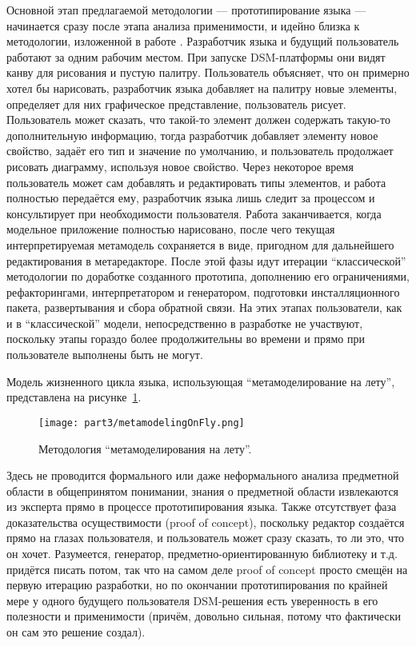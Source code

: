 Основной этап предлагаемой методологии --- прототипирование языка --- начинается сразу 
после этапа анализа применимости, и идейно близка к методологии, изложенной в работе 
\cite{repenning1995agentsheets}. Разработчик языка и будущий пользователь работают 
за одним рабочим местом. При запуске DSM-платформы они видят канву для рисования и 
пустую палитру. Пользователь объясняет, что он примерно хотел бы нарисовать, разработчик 
языка добавляет на палитру новые элементы, определяет для них графическое представление, 
пользователь рисует. Пользователь может сказать, что такой-то элемент должен содержать 
такую-то дополнительную информацию, тогда разработчик добавляет элементу новое свойство, 
задаёт его тип и значение по умолчанию, и пользователь продолжает рисовать диаграмму, 
используя новое свойство. Через некоторое время пользователь может сам добавлять и 
редактировать типы элементов, и работа полностью передаётся ему, разработчик языка 
лишь следит за процессом и консультирует при необходимости пользователя. Работа заканчивается, 
когда модельное приложение полностью нарисовано, после чего текущая интерпретируемая 
метамодель сохраняется в виде, пригодном для дальнейшего редактирования в метаредакторе. 
После этой фазы идут итерации "`классической"' методологии по доработке созданного 
прототипа, дополнению его ограничениями, рефакторингами, интерпретатором и генератором, 
подготовки инсталляционного пакета, развертывания и сбора обратной связи. На этих этапах 
пользователи, как и в "`классической"' модели, непосредственно в разработке не участвуют, 
поскольку этапы гораздо более продолжительны во времени и прямо при пользователе выполнены 
быть не могут.

Модель жизненного цикла языка, использующая "`метамоделирование на лету"', представлена 
на рисунке~\ref{metamodelingOnFly}.

\begin{figure} [ht]
	\begin{center}
		\texttt{[image: part3/metamodelingOnFly.png]}
		\caption{Методология "`метамоделирования на лету"'.}
		\label{metamodelingOnFly}
	\end{center}
\end{figure}

Здесь не проводится формального или даже неформального анализа предметной области в 
общепринятом понимании, знания о предметной области извлекаются из эксперта прямо 
в процессе прототипирования языка. Также отсутствует фаза доказательства осуществимости 
(proof of concept), поскольку редактор создаётся прямо на глазах пользователя, и пользователь 
может сразу сказать, то ли это, что он хочет. Разумеется, генератор, предметно-ориентированную 
библиотеку и т.д. придётся писать потом, так что на самом деле proof of concept просто 
смещён на первую итерацию разработки, но по окончании прототипирования по крайней мере 
у одного будущего пользователя DSM-решения есть уверенность в его полезности и применимости 
(причём, довольно сильная, потому что фактически он сам это решение создал).

